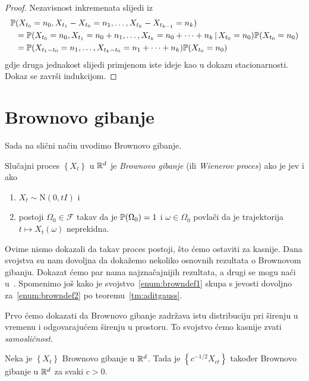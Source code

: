 \documentclass[main.tex]{subfiles}
\begin{document}
\begin{proof}
	Nezavisnost inkremenata slijedi iz
	\begin{equation}
		\begin{aligned}
			\P & (X_{t_0}=n_0, X_{t_1}- X_{t_0} = n_1, \ldots, X_{t_k}-X_{t_{k-1}} = n_k)                                \\
			   & =\P(X_{t_0} = n_0, X_{t_1}=n_0+n_1, \ldots, X_{t_k} = n_0+\cdots+n_k \given X_{t_0}=n_0)\P(X_{t_0}=n_0) \\
			   & =\P(X_{t_1-t_0}=n_1,\ldots,X_{t_k-t_0}=n_1+\cdots+n_k)\P(X_{t_0}=n_0)
		\end{aligned}
	\end{equation}
	gdje druga jednakost slijedi primjenom iste ideje kao u dokazu stacionarnosti. Dokaz se završi indukcijom.
\end{proof}

\section{Brownovo gibanje}\label{sec:sp-brown}
Sada na slični način uvodimo Brownovo gibanje.

\begin{definicija} \label{def:brown}
	Slučajni proces \( \left\{ X_t \right\} \) u \( \R^d \) je \emph{Brownovo gibanje} (ili \emph{Wienerov proces}) ako je \levy jev i ako
	\begin{enumerate}[label=(\roman*)]
		\item \( X_t \sim \mathrm N(0, tI) \) i \label{enum:browndef1}
		\item postoji \( \Omega_0 \in \mathcal F \) takav da je \( \P(\Omega_0)=1 \) i \( \omega \in \Omega_0 \) povlači da je trajektorija \( t \mapsto X_t(\omega) \) neprekidna. \label{enum:browndef2}
	\end{enumerate}
\end{definicija}

Ovime nismo dokazali da takav proces postoji, što ćemo ostaviti za kasnije. Dana svojstva su nam dovoljna da dokažemo nekoliko osnovnih rezultata
o Brownovom gibanju. Dokazat ćemo par nama najznačajnijih rezultata, a drugi se mogu naći u~\cite[]{sato}. Spomenimo još kako je svojstvo~\ref{enum:browndef1}
skupa s \levy jevosti dovoljno za~\ref{enum:browndef2} po teoremu~\ref{tm:aditgauss}.

Prvo ćemo dokazati da Brownovo gibanje zadržava istu distribuciju pri širenju u vremenu i odgovarajućem širenju u prostoru. To svojstvo ćemo kasnije zvati
\emph{samosličnost}.

\begin{teorem} \label{tm:brown-samoslicnost}
	Neka je \( \left\{ X_t \right\} \) Brownovo gibanje u \( \R^d \). Tada je \( \left\{ c^{-1/2}X_{ct} \right\} \) također Brownovo gibanje
	u \( \R^d \) za svaki \( c > 0 \).
\end{teorem}
\end{document}
